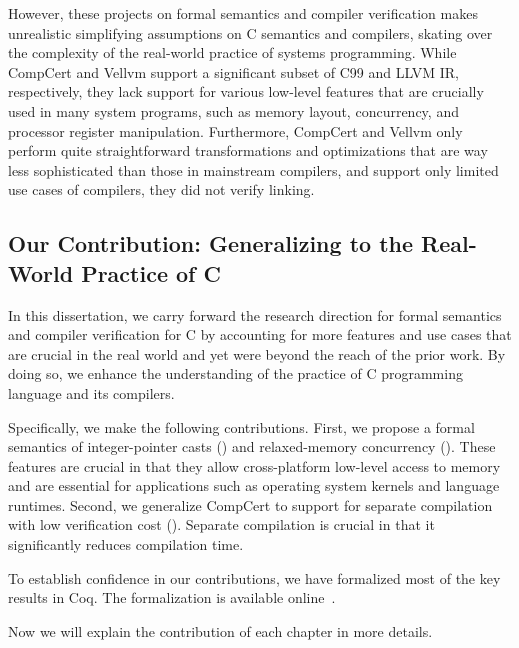 
However, these projects on formal semantics and compiler verification makes unrealistic simplifying
assumptions on C semantics and compilers, skating over the complexity of the real-world practice of
systems programming.  While CompCert and Vellvm support a significant subset of C99 and LLVM IR,
respectively, they lack support for various low-level features that are crucially used in many
system programs, such as memory layout, concurrency, and processor register manipulation.
Furthermore, CompCert and Vellvm only perform quite straightforward transformations and
optimizations that are way less sophisticated than those in mainstream compilers, and support only
limited use cases of compilers, \eg{} they did not verify linking.


\subsection{Our Contribution: Generalizing to the Real-World Practice of C}

In this dissertation, we carry forward the research direction for formal semantics and compiler
verification for C by accounting for more features and use cases that are crucial in the real world
and yet were beyond the reach of the prior work.  By doing so, we enhance the understanding of the
practice of C programming language and its compilers.

Specifically, we make the following contributions.  First, we propose a formal semantics of
integer-pointer casts () and relaxed-memory concurrency ().
These features are crucial in that they allow cross-platform low-level access to memory and are
essential for applications such as operating system kernels and language runtimes.  Second, we
generalize CompCert to support for separate compilation with low verification cost
().  Separate compilation is crucial in that it significantly reduces compilation
time.

To establish confidence in our contributions, we have formalized most of the key results in Coq.
The formalization is available online~\cite{kang-phd-thesis-web}.

Now we will explain the contribution of each chapter in more details.




